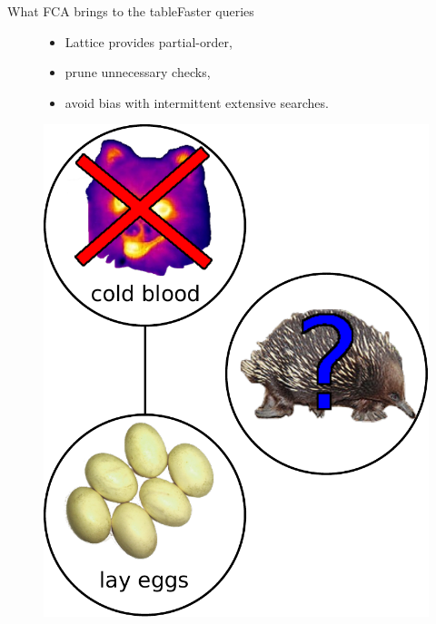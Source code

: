 \begin{frame}{What FCA brings to the table}{Faster queries}
\begin{figure}[ht]
  \begin{minipage}[t]{0.52\linewidth}
    \vspace{0pt}
      \begin{itemize}
      \item Lattice provides partial-order,
      \item prune unnecessary checks,
      \item avoid bias with intermittent extensive searches.
      \end{itemize}
  \end{minipage}
  \hfill
  \begin{minipage}[t]{0.45\linewidth}
    \vspace{0pt}
    \centering
    \includegraphics[width=\textwidth]{img/fca/hierarchy2}		
  \end{minipage}
\end{figure}

\end{frame}


